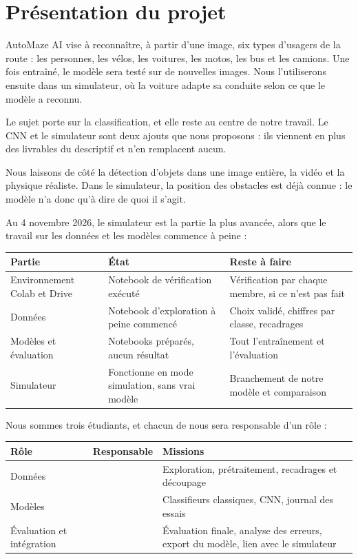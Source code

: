 \section{Présentation du projet}
\label{sec:presentation}

AutoMaze AI vise à reconnaître, à partir d'une image, six types d'usagers de la route : les personnes, les vélos, les voitures, les motos, les bus et les camions. Une fois entraîné, le modèle sera testé sur de nouvelles images. Nous l'utiliserons ensuite dans un simulateur, où la voiture adapte sa conduite selon ce que le modèle a reconnu.

Le sujet porte sur la classification, et elle reste au centre de notre travail. Le CNN et le simulateur sont deux ajouts que nous proposons : ils viennent en plus des livrables du descriptif et n'en remplacent aucun.

Nous laissons de côté la détection d'objets dans une image entière, la vidéo et la physique réaliste. Dans le simulateur, la position des obstacles est déjà connue : le modèle n'a donc qu'à dire de quoi il s'agit.

Au 4 novembre 2026, le simulateur est la partie la plus avancée, alors que le travail sur les données et les modèles commence à peine :

\begin{center}
\begin{tabularx}{\textwidth}{>{\raggedright\arraybackslash}p{4cm}YY}
  \toprule
  \textbf{Partie} & \textbf{État} & \textbf{Reste à faire} \\
  \midrule
  Environnement Colab et Drive & Notebook de vérification exécuté & Vérification par chaque membre, si ce n'est pas fait \\
  Données & Notebook d'exploration à peine commencé & Choix validé, chiffres par classe, recadrages \\
  Modèles et évaluation & Notebooks préparés, aucun résultat & Tout l'entraînement et l'évaluation \\
  Simulateur & Fonctionne en mode simulation, sans vrai modèle & Branchement de notre modèle et comparaison \\
  \bottomrule
\end{tabularx}
\end{center}

Nous sommes trois étudiants, et chacun de nous sera responsable d'un rôle :

\begin{center}
\begin{tabularx}{\textwidth}{>{\raggedright\arraybackslash}p{4cm}>{\raggedright\arraybackslash}p{2.8cm}Y}
  \toprule
  \textbf{Rôle} & \textbf{Responsable} & \textbf{Missions} \\
  \midrule
  Données &  & Exploration, prétraitement, recadrages et découpage \\
  Modèles &  & Classifieurs classiques, CNN, journal des essais \\
  Évaluation et intégration &  & Évaluation finale, analyse des erreurs, export du modèle, lien avec le simulateur \\
  \bottomrule
\end{tabularx}
\end{center}
